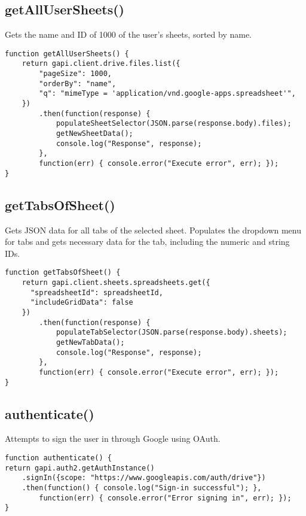 \documentclass[letterpaper]{article}
\begin{document}
\subsection{getAllUserSheets()}

Gets the name and ID of 1000 of the user's sheets, sorted by name.

\begin{lstlisting}[firstnumber=56]
function getAllUserSheets() {
    return gapi.client.drive.files.list({
        "pageSize": 1000,
        "orderBy": "name",
        "q": "mimeType = 'application/vnd.google-apps.spreadsheet'",
    })
        .then(function(response) {
            populateSheetSelector(JSON.parse(response.body).files);
            getNewSheetData();
            console.log("Response", response);
        },
        function(err) { console.error("Execute error", err); });
}
\end{lstlisting}

\subsection{getTabsOfSheet()}

Gets JSON data for all tabs of the selected sheet.
Populates the dropdown menu for tabs and gets necessary data for the tab, including the numeric and string IDs.

\begin{lstlisting}[firstnumber=70]
function getTabsOfSheet() {
    return gapi.client.sheets.spreadsheets.get({
      "spreadsheetId": spreadsheetId,
      "includeGridData": false
    })
        .then(function(response) {
            populateTabSelector(JSON.parse(response.body).sheets);
            getNewTabData();
            console.log("Response", response);
        },
        function(err) { console.error("Execute error", err); });
}
\end{lstlisting}

\subsection{authenticate()}

Attempts to sign the user in through Google using OAuth.

\begin{lstlisting}[firstnumber=83]
function authenticate() {
return gapi.auth2.getAuthInstance()
    .signIn({scope: "https://www.googleapis.com/auth/drive"})
    .then(function() { console.log("Sign-in successful"); },
        function(err) { console.error("Error signing in", err); });
}
\end{lstlisting}
\end{document}
